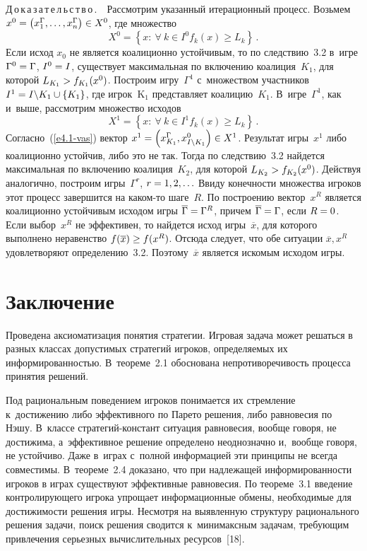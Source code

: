 \begin{multicols}{2}
    \noindent
    Д\,о\,к\,а\,з\,а\,т\,е\,л\,ь\,с\,т\,в\,о\,.\ \ Рассмотрим указанный итерационный
процесс. Возьмем $x^0\hm= \left( x_1^\Gamma,\ldots, x_n^\Gamma\right) \hm\in X^0$,
где множество
    $$
    X^0= \left\{ x:\ \forall\ k\in I^0 f_k(x)\geq L_k\right\}\,.
    $$
Если исход $x_0$ не является коалиционно устойчивым, то по следствию~3.2 в~игре
$\Gamma^0\hm= \Gamma$, $I^0\hm=I$, существует максимальная по включению
коалиция~$K_1$, для которой $L_{K_1}\hm> f_{K_1}(x^0)$. Построим
игру~$\Gamma^1$ с~множеством участников $I^1\hm= I\backslash K_1 \cup \{K_1\}$,
где игрок~K$_1$ представляет коалицию~$K_1$. В~игре~$\Gamma^1$, как и~выше,
рассмотрим множество исходов
$$
X^1= \left\{ x:\ \forall\ k\in I^1 f_k(x)\geq L_k\right\}\,.
$$
Согласно~(\ref{e4.1-vas}) вектор $x^1\hm= \left( x^\Gamma_{K_1}, x^0_{I\backslash
K_1}\right) \hm\in X^1$. Результат игры~$x^1$ либо коалиционно устойчив, либо это
не так. Тогда по следствию~3.2 найдется максимальная по включению
коалиция~$K_2$, для которой $L_{K_2}\hm> f_{K_2}(x^0)$. Действуя аналогично,
построим игры~$\Gamma^r$, $r\hm=1,2,\ldots$ Ввиду конечности множества
игроков этот процесс завершится на ка\-ком-то шаге~$R$. По построению
вектор~$x^R$ является коалиционно устойчивым исходом игры
$\overline{\Gamma}\hm= \Gamma^R$, причем $\overline{\Gamma}\hm= \Gamma$,
если $R\hm=0$. Если выбор~$x^R$ не эффективен, то найдется исход
игры~$\overline{x}$, для которого выполнено неравенство $f(\overline{x}) \hm\geq
f(x^R)$. Отсюда следует, что обе ситуации $\overline{x},x^R$ удовлетворяют
определению~3.2. Поэтому~$\overline{x}$ является искомым исходом игры.

\section{Заключение}

    Проведена аксиоматизация понятия стратегии. Игровая задача может решаться
в разных классах допустимых стратегий игроков, определяемых их
информированностью. В~тео\-ре\-ме~2.1 обоснована непротиворечивость процесса
принятия решений.

    Под рациональным поведением игроков понимается их стремление к~достижению либо эффективного по Парето решения, либо равновесия по Нэшу.
В~классе стра\-те\-гий-констант ситуация равновесия, вообще говоря, не
достижима, а~эффективное решение определено неоднозначно и,~вообще говоря, не
устойчиво. Даже в~играх с~полной информацией эти принципы не всегда
совместимы.
    В~тео\-ре\-ме~2.4 доказано, что при надлежащей информированности игроков
в играх существуют эффективные равновесия. По теореме~3.1 введение
контролирующего игрока упрощает информационные обмены, необходимые для
достижимости решения игры. Несмотря на выявленную структуру рационального
решения задачи, поиск решения сводится к~минимаксным задачам, требующим
привлечения серьезных вычислительных ресурсов~[18].


\end{multicols}
